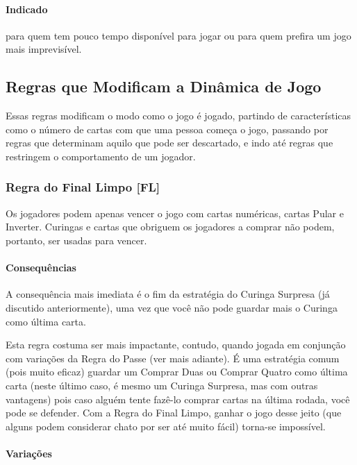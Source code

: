 \paragraph{Indicado}

para quem tem pouco tempo disponível para jogar ou para quem prefira um jogo mais imprevisível.

\subsection{Regras que Modificam a Dinâmica de Jogo}

Essas regras modificam o modo como o jogo é jogado, partindo de características como o número de cartas com que uma pessoa começa o jogo, passando por regras que determinam aquilo que pode ser descartado, e indo até regras que restringem o comportamento de um jogador.

\subsubsection{Regra do Final Limpo [FL]}

Os jogadores podem apenas vencer o jogo com cartas numéricas, cartas Pular e Inverter. Curingas e cartas que obriguem os jogadores a comprar não podem, portanto, ser usadas para vencer.

\paragraph{Consequências}

A consequência mais imediata é o fim da estratégia do Curinga Surpresa (já discutido anteriormente), uma vez que você não pode guardar mais o Curinga como última carta.

Esta regra costuma ser mais impactante, contudo, quando jogada em conjunção com variações da Regra do Passe (ver mais adiante). É uma estratégia comum (pois muito eficaz) guardar um Comprar Duas ou Comprar Quatro como última carta (neste último caso, é mesmo um Curinga Surpresa, mas com outras vantagens) pois caso alguém tente fazê-lo comprar cartas na última rodada, você pode se defender. Com a Regra do Final Limpo, ganhar o jogo desse jeito (que alguns podem considerar chato por ser até muito fácil) torna-se impossível.

\paragraph{Variações}

